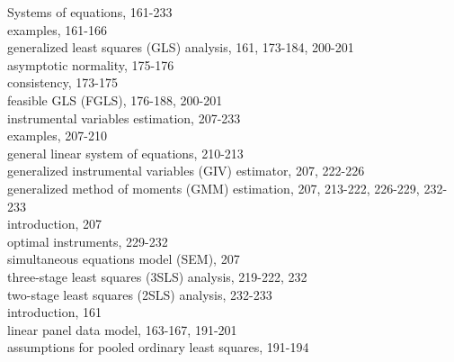\documentclass[10pt]{article}
\begin{document}
Systems of equations, 161-233\\
examples, 161-166\\
generalized least squares (GLS) analysis, 161, 173-184, 200-201\\
asymptotic normality, 175-176\\
consistency, 173-175\\
feasible GLS (FGLS), 176-188, 200-201\\
instrumental variables estimation, 207-233\\
examples, 207-210\\
general linear system of equations, 210-213\\
generalized instrumental variables (GIV) estimator, 207, 222-226\\
generalized method of moments (GMM) estimation, 207, 213-222, 226-229, 232-233\\
introduction, 207\\
optimal instruments, 229-232\\
simultaneous equations model (SEM), 207\\
three-stage least squares (3SLS) analysis, 219-222, 232\\
two-stage least squares (2SLS) analysis, 232-233\\
introduction, 161\\
linear panel data model, 163-167, 191-201\\
assumptions for pooled ordinary least squares, 191-194
\end{document}
